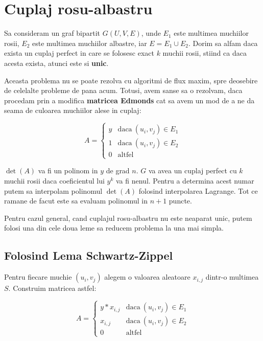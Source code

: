 \pagebreak

\section{Cuplaj rosu-albastru}

Sa consideram un graf bipartit $G(U, V, E)$, unde $E_{1}$ este multimea
muchiilor rosii, $E_{2}$ este multimea muchiilor albastre, iar
$E = E_{1} \cup E_{2}$. Dorim sa alfam daca exista un cuplaj perfect
in care se folosesc exact $k$ muchii rosii, stiind ca daca acesta exista, atunci
este si \textbf{unic}. \par

Aceasta problema nu se poate rezolva cu algoritmi de flux maxim, spre deosebire
de celelalte probleme de pana acum. Totusi, avem sanse sa o rezolvam, daca
procedam prin a modifica \textbf{matricea Edmonds} cat sa avem un mod de a ne da seama de
culoarea muchiilor alese in cuplaj:

\begin{equation}
  A=
  \begin{cases}
    y & \text{daca}\ (u_{i}, v_{j}) \in E_{1} \\
    1 & \text{daca}\ (u_{i}, v_{j}) \in E_{2} \\
    0 & \text{altfel}
  \end{cases}
\end{equation}

$\det(A)$ va fi un polinom in $y$ de grad $n$. $G$ va avea un cuplaj perfect cu
$k$ muchii rosii daca coeficientul lui $y^{k}$ va fi nenul. Pentru a determina
acest numar putem sa interpolam polinomul $\det(A)$ folosind interpolarea
Lagrange. Tot ce ramane de facut este sa evaluam polinomul in $n+1$ puncte. \par

Pentru cazul general, cand cuplajul rosu-albastru nu este neaparat unic, putem
folosi una din cele doua leme sa reducem problema la una mai simpla.

\subsection{Folosind Lema Schwartz-Zippel}

Pentru fiecare muchie $(u_{i}, v_{j})$ alegem o valoarea aleatoare $x_{i,j}$ dintr-o
multimea $S$. Construim matricea astfel:

\begin{equation}
  A=
  \begin{cases}
    y * x_{i,j} & \text{daca}\ (u_{i}, v_{j}) \in E_{1} \\
    x_{i,j} & \text{daca}\ (u_{i}, v_{j}) \in E_{2} \\
    0 & \text{altfel}
  \end{cases}
\end{equation}

